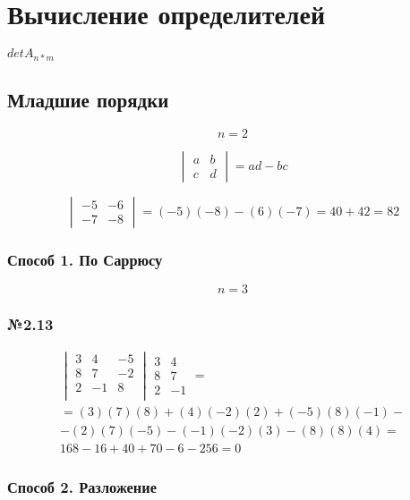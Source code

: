 \documentclass{article}
\begin{document}
\section{Вычисление определителей}

$detA_{n*m}$

\subsection{Младшие порядки}
\[
n = 2
\]

\[
\begin{vmatrix}
	a & b \\
	c & d
\end{vmatrix}
= ad - bc
\]

\[
\begin{vmatrix}
	-5 & -6 \\
	-7 & -8
\end{vmatrix}
= (-5)(-8) - (6)(-7) = 40 + 42 = 82
\]

\subsubsection{Способ 1. По Саррюсу}
\[
n = 3
\]

\subsubsection*{№2.13}

\begin{gather*}
\begin{vmatrix}
	3 & 4 & -5 \\
	8 & 7 & -2 \\
	2 & -1 & 8 \\	
\end{vmatrix}
\begin{matrix}
	3 & 4 \\
	8 & 7 \\
	2 & -1
\end{matrix} = \\
= (3)(7)(8) + (4)(-2)(2) + (-5)(8)(-1) - \\
- (2)(7)(-5) - (-1)(-2)(3) - (8)(8)(4) = \\
168 - 16 + 40 + 70 - 6 - 256 = 0
\end{gather*}

\subsubsection{Способ 2. Разложение}
\end{document}
